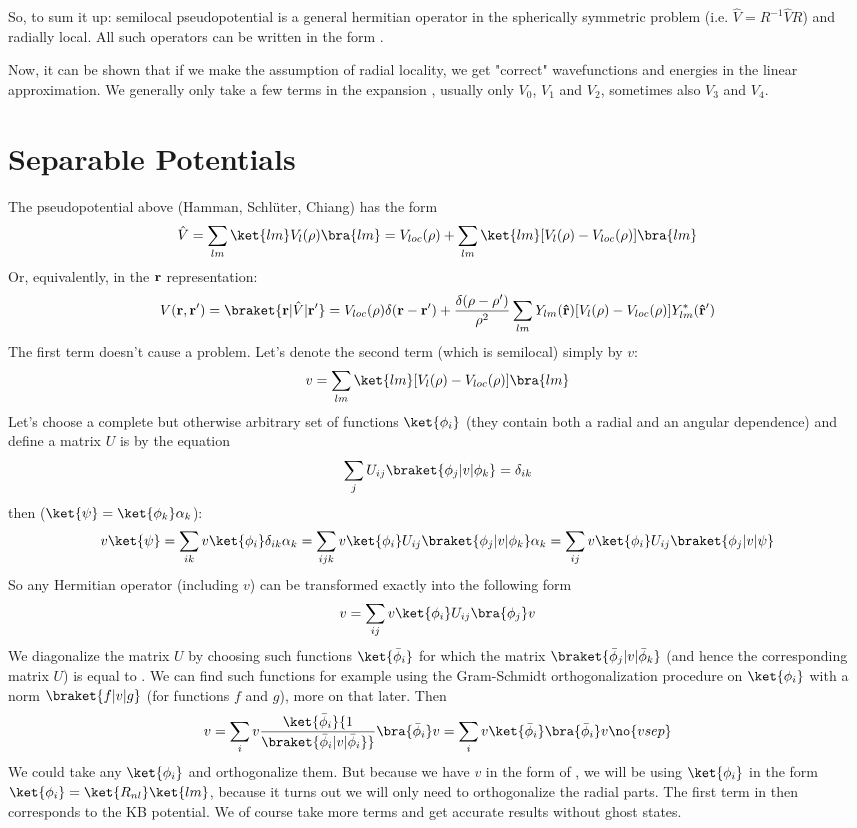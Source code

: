 So, to sum it up: semilocal pseudopotential is a general hermitian operator
in the spherically symmetric problem (i.e. $\hat V=R^{-1}\hat VR$) and radially
local. All such operators can be written in the form .

Now, it can be shown that if we make the assumption of radial locality, we get
"correct" wavefunctions and energies in the linear approximation. We generally
only take a few terms in the expansion , usually only $V_0$,
$V_1$ and $V_2$, sometimes also $V_3$ and $V_4$.

\section{Separable Potentials}

The pseudopotential above (Hamman, Schl\"uter, Chiang) has the form
$$\hat V=\sum_{lm} \ket{lm}V_l(\rho)\bra{lm}
=V_{loc}(\rho)+\sum_{lm} \ket{lm}[V_l(\rho)-V_{loc}(\rho)]\bra{lm}$$
Or, equivalently, in the $\bf r$ representation:
$$V({\bf r},{\bf r'})=\braket{{\bf r}|\hat V|{\bf r'}}=
V_{loc}(\rho)\delta({\bf r}-{\bf r'})+{\delta(\rho-\rho')\over\rho^2}
\sum_{lm}Y_{lm}({\bf\hat r})[V_l(\rho)-V_{loc}(\rho)]Y_{lm}^*({\bf\hat r'})$$
The first term doesn't cause a problem. Let's denote the second term (which is
semilocal) simply by $v$:
$$v=\sum_{lm} \ket{lm}[V_l(\rho)-V_{loc}(\rho)]\bra{lm}$$
Let's choose a complete but otherwise arbitrary set of functions
$\ket{\phi_i}$ (they contain both a radial and an angular dependence) and
define a matrix $U$ is by the equation
$$\sum_j U_{ij}\braket{\phi_j|v|\phi_k}=\delta_{ik}$$
then ($\ket{\psi}=\ket{\phi_k}\alpha_k$):
$$v\ket{\psi}
=\sum_{ik}v\ket{\phi_i}\delta_{ik}\alpha_k
=\sum_{ijk}v\ket{\phi_i}U_{ij}\braket{\phi_j|v|\phi_k}\alpha_k
=\sum_{ij}v\ket{\phi_i}U_{ij}\braket{\phi_j|v|\psi}
$$
So any Hermitian operator (including $v$) can be transformed exactly into the
following form
$$v=\sum_{ij}v\ket{\phi_i}U_{ij}\bra{\phi_j}v$$
We diagonalize the matrix $U$ by choosing
such functions $\ket{\bar\phi_i}$ for which the matrix
$\braket{\bar\phi_j|v|\bar\phi_k}$ (and hence the corresponding matrix $U$) is
equal to \one. We can find such functions for example using the Gram-Schmidt
orthogonalization procedure on $\ket{\phi_i}$ with a norm $\braket{f|v|g}$ (for
functions $f$ and $g$), more on that later. Then 
$$v
=\sum_{i}v\ket{\bar\phi_i}{1\over\braket{\bar\phi_i|v|\bar\phi_i}}
\bra{\bar\phi_i}v 
=\sum_{i}v\ket{\bar\phi_i}\bra{\bar\phi_i}v 
\no{vsep}$$
We could take any $\ket{\phi_i}$ and orthogonalize them. But because we have
$v$ in the form of , we will be using $\ket{\phi_i}$ in the form
$\ket{\phi_i}=\ket{R_{nl}}\ket{lm}$, because it turns out we will only need to orthogonalize the radial
parts. The first term in  then corresponds to
the KB potential. We of course take more terms and get accurate results without
ghost states.

